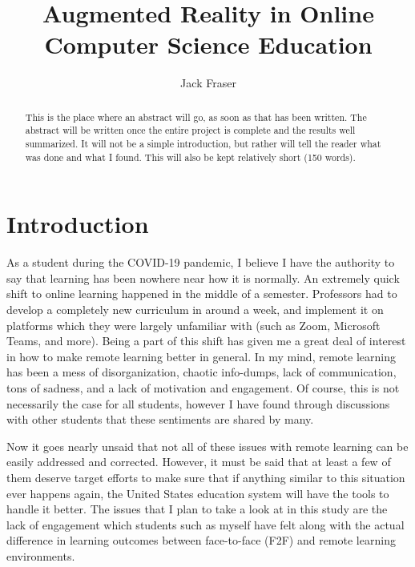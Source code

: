 \documentclass[sigconf]{acmart}
\begin{document}
\title{Augmented Reality in Online Computer Science Education}

\author{Jack Fraser}

\renewcommand{\shortauthors}{Fraser}

\begin{abstract}
  This is the place where an abstract will go, as soon as that has been written. The abstract will
  be written once the entire project is complete and the results well summarized. It will not be
  a simple introduction, but rather will tell the reader what was done and what I found. This will
  also be kept relatively short (150 words).
\end{abstract}


\maketitle

\section{Introduction}
As a student during the COVID-19 pandemic, I believe I have the authority to say that learning has been nowhere near how it is normally. An extremely quick shift to online learning happened in the middle of a semester. Professors had to develop a completely new curriculum in around a week, and implement it on platforms which they were largely unfamiliar with (such as Zoom, Microsoft Teams, and more). Being a part of this shift has given me a great deal of interest in how to make remote learning better in general. In my mind, remote learning has been a mess of disorganization, chaotic info-dumps, lack of communication, tons of sadness, and a lack of motivation and engagement. Of course, this is not necessarily the case for all students, however I have found through discussions with other students that these sentiments are shared by many.

Now it goes nearly unsaid that not all of these issues with remote learning can be easily addressed and corrected. However, it must be said that at least a few of them deserve target efforts to make sure that if anything similar to this situation ever happens again, the United States education system will have the tools to handle it better. The issues that I plan to take a look at in this study are the lack of engagement which students such as myself have felt along with the actual difference in learning outcomes between face-to-face (F2F) and remote learning environments.
\end{document}
